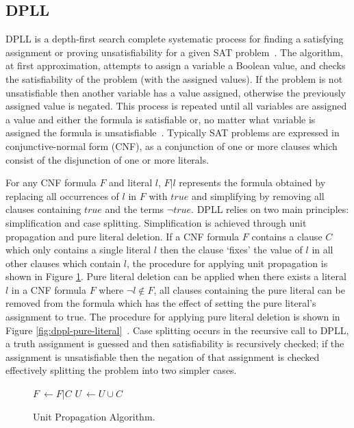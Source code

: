 \documentclass[]{final_report}
\begin{document}
\subsection{DPLL}
DPLL is a depth-first search complete systematic process for finding a satisfying assignment or proving unsatisfiability for a given SAT problem~\cite{Davis:1962:MPT:368273.368557}. The algorithm, at first approximation, attempts to assign a variable a Boolean value, and checks the satisfiability of the problem (with the assigned values). If the problem is not unsatisfiable then another variable has a value assigned, otherwise the previously assigned value is negated. This process is repeated until all variables are assigned a value and either the formula is satisfiable or, no matter what variable is assigned the formula is unsatisfiable~\cite{sattosmt}. Typically SAT problems are expressed in conjunctive-normal form (CNF), as a conjunction of one or more clauses which consist of the disjunction of one or more literals. 

For any CNF formula $F$ and literal $l$, $\mathit{F}|l$ represents the formula obtained by replacing all occurrences of $l$ in $F$ with $true$ and simplifying by removing all clauses containing $true$ and the terms $\lnot{true}$. DPLL relies on two main principles: simplification and case splitting. Simplification is achieved through unit propagation and pure literal deletion. If a CNF formula $\mathit{F}$ contains a clause $C$ which only contains a single literal $l$ then the clause `fixes' the value of $l$ in all other clauses which contain $l$, the procedure for applying unit propagation is shown in Figure \ref{fig:dppl-unit-propagate}. Pure literal deletion can be applied when there exists a literal $l$ in a CNF formula $\mathit{F}$ where $\lnot{l} \notin \mathit{F}$, all clauses containing the pure literal can be removed from the formula which has the effect of setting the pure literal's assignment to true. The procedure for applying pure literal deletion is shown in Figure \ref{fig:dppl-pure-literal}~\cite{dpll-worksheet,dpll-method}. Case splitting occurs in the recursive call to DPLL, a truth assignment is guessed and then satisfiability is recursively checked; if the assignment is unsatisfiable then the negation of that assignment is checked effectively splitting the problem into two simpler cases.

\begin{figure}[t]
\begin{algorithmic}
		\State $\mathit{F}~\gets \mathit{F}|C$
		\State $U~\gets U \cup {C}$
	\EndWhile
\EndFunction    
\end{algorithmic}

\caption{\label{fig:dppl-unit-propagate} Unit Propagation Algorithm.}
\end{figure}
\end{document}
